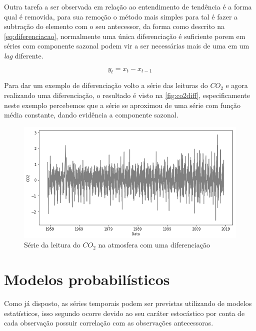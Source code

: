\documentclass[
    12pt,
    oneside,
    a4paper,
    english,
    brazil
]{abntex2}
\begin{document}
Outra tarefa a ser observada em relação ao entendimento de tendência é a forma
qual é removida, para sua remoção o método mais simples para tal é fazer a
subtração do elemento com o seu antecessor, da forma como descrito na
\autoref{eq:diferenciacao}, normalmente uma única diferenciação é suficiente
porem em séries com componente sazonal podem vir a ser necessárias mais de uma
em um \textit{lag} diferente.

\begin{equation}
    \label{eq:diferenciacao}
    y_t = x_t - x_{t-1}
\end{equation}

Para dar um exemplo de diferenciação volto a série das leituras do $CO_2$ e
agora realizando uma diferenciação, o resultado é visto na
\autoref{fig:co2diff}, especificamente neste exemplo percebemos que a série se
aproximou de uma série com função média constante, dando evidência a componente
sazonal.

\begin{figure}
    \centering
    \caption{Série da leitura do $CO_2$ na atmosfera com uma
    diferenciação}\label{fig:co2diff}
    \includegraphics[width=.6\linewidth]{images/co2_diff.png}
\end{figure}

%


\section{Modelos probabilísticos}

Como já disposto, as séries temporais podem ser previstas utilizando de modelos
estatísticos, isso segundo  ocorre devido ao seu caráter
estocástico por conta de cada observação possuir correlação com as observações
antecessoras.
\end{document}
